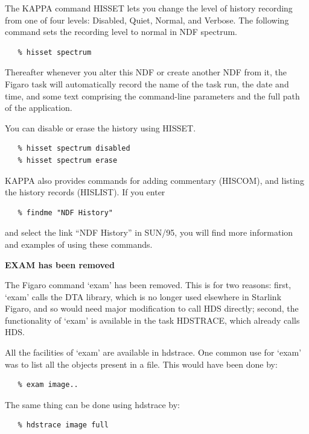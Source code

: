    The KAPPA command HISSET lets you change the level of history
   recording from one of four levels: Disabled, Quiet, Normal,
   and Verbose.  The following command sets the recording level
   to normal in NDF spectrum.

\begin{verbatim}
   % hisset spectrum
\end{verbatim}

   Thereafter whenever you alter this NDF or create another NDF
   from it, the Figaro task will automatically record the name of
   the task run, the date and time, and some text comprising the
   command-line parameters and the full path of the application.

   You can disable or erase the history using HISSET.

\begin{verbatim}
   % hisset spectrum disabled
   % hisset spectrum erase
\end{verbatim}

   KAPPA also provides commands for adding commentary (HISCOM),
   and listing the history records (HISLIST).  If you enter

\begin{verbatim}
   % findme "NDF History"
\end{verbatim}

   and select the link ``NDF History'' in SUN/95, you will find
   more information and examples of using these commands.


{\bf    EXAM has been removed}

   The Figaro command `exam' has been removed.  This is for two
   reasons: first, `exam' calls the DTA library, which is no longer
   used elsewhere in Starlink Figaro, and so would need major
   modification to call HDS directly; second, the functionality of
   `exam' is available in the task HDSTRACE, which already calls HDS.

   All the facilities of `exam' are available in hdstrace.  One
   common use for `exam' was to list all the objects present in a
   file.  This would have been done by:

\begin{verbatim}
   % exam image..
\end{verbatim}

   The same thing can be done using hdstrace by:

\begin{verbatim}
   % hdstrace image full
\end{verbatim}

